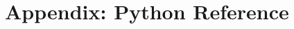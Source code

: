 \documentclass[../notes.tex]{subfiles}
\begin{document}
\section{Appendix: Python Reference}
\end{document}
